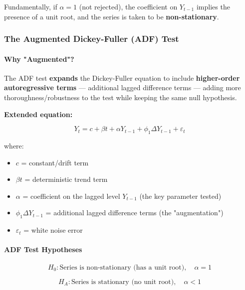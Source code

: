 \documentclass[12pt,openany]{book}
\begin{document}
Fundamentally, if \(\alpha = 1\) (not rejected), the coefficient on \(Y_{t-1}\) implies the presence of a unit root, and the series is taken to be \textbf{non-stationary}.

\subsubsection{The Augmented Dickey-Fuller (ADF) Test}

\paragraph{Why "Augmented"?}

The ADF test \textbf{expands} the Dickey-Fuller equation to include \textbf{higher-order autoregressive terms} --- additional lagged difference terms --- adding more thoroughness/robustness to the test while keeping the same null hypothesis.

\textbf{Extended equation:}

\begin{equation*}
    Y_t = c + \beta t + \alpha Y_{t-1} + \phi_1 \Delta Y_{t-1} + \varepsilon_t \tag{1}
\end{equation*}

where:
\begin{itemize}[leftmargin=*]
    \item \(c\) = constant/drift term
    \item \(\beta t\) = deterministic trend term
    \item \(\alpha\) = coefficient on the lagged level \(Y_{t-1}\) (the key parameter tested)
    \item \(\phi_1 \Delta Y_{t-1}\) = additional lagged difference terms (the "augmentation")
    \item \(\varepsilon_t\) = white noise error
\end{itemize}

\paragraph{ADF Test Hypotheses}

\begin{equation*}
    H_0: \text{Series is non-stationary (has a unit root)}, \quad \alpha = 1
\end{equation*}

\begin{equation*}
    H_A: \text{Series is stationary (no unit root)}, \quad \alpha < 1
\end{equation*}
\end{document}
